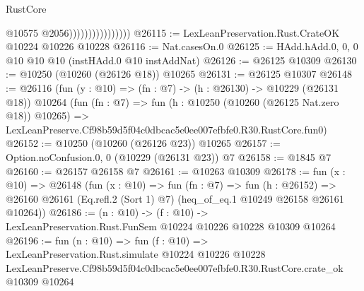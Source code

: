 \begin{lexlean}{RustCore}
\begin{coremodule}
                                    @10575
                                    @2056))))))))))))))))
@26115 := LexLeanPreservation.Rust.CrateOK @10224 @10226 @10228
@26116 := Nat.casesOn.{0}
@26125 := HAdd.hAdd.{0, 0, 0} @10 @10 @10 (instHAdd.{0} @10 instAddNat)
@26126 := @26125 @10309
@26130 := @10250 (@10260 (@26126 @18)) @10265
@26131 := @26125 @10307
@26148 := @26116
    (fun (y : @10) => (fn : @7) -> (h : @26130) -> @10229 (@26131 @18))
    @10264
    (fun (fn : @7) =>
    fun (h : @10250 (@10260 (@26125 Nat.zero @18)) @10265) =>
    LexLeanPreserve.Cf98b59d5f04c0dbcac5e0ee007efbfe0.R30.RustCore.fun0)
@26152 := @10250 (@10260 (@26126 @23)) @10265
@26157 := Option.noConfusion.{0, 0} (@10229 (@26131 @23)) @7
@26158 := @1845 @7
@26160 := @26157 @26158 @7
@26161 := @10263 @10309
@26178 := fun (x : @10) =>
  @26148
    (fun (x : @10) =>
    fun (fn : @7) =>
    fun (h : @26152) =>
    @26160 @26161 (Eq.refl.{2} (Sort 1) @7) (heq_of_eq.{1} @10249 @26158 @26161 @10264))
@26186 := (n : @10) ->
  (f : @10) -> LexLeanPreservation.Rust.FunSem @10224 @10226 @10228 @10309 @10264
@26196 := fun (n : @10) =>
  fun (f : @10) =>
  LexLeanPreservation.Rust.simulate
    @10224
    @10226
    @10228
    LexLeanPreserve.Cf98b59d5f04c0dbcac5e0ee007efbfe0.R30.RustCore.crate_ok
    @10309
    @10264
\end{coremodule}
\end{lexlean}
